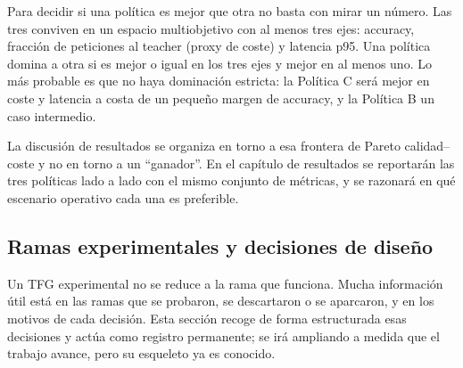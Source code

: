 Para decidir si una política es mejor que otra no basta con mirar un número. Las tres conviven en un espacio multiobjetivo con al menos tres ejes: accuracy, fracción de peticiones al teacher (proxy de coste) y latencia p95. Una política domina a otra si es mejor o igual en los tres ejes y mejor en al menos uno. Lo más probable es que no haya dominación estricta: la Política C será mejor en coste y latencia a costa de un pequeño margen de accuracy, y la Política B un caso intermedio.

La discusión de resultados se organiza en torno a esa frontera de Pareto calidad--coste y no en torno a un ``ganador''. En el capítulo de resultados se reportarán las tres políticas lado a lado con el mismo conjunto de métricas, y se razonará en qué escenario operativo cada una es preferible.

\subsection{Ramas experimentales y decisiones de diseño}
\label{subsec:ramas-experimentales}

Un TFG experimental no se reduce a la rama que funciona. Mucha información útil está en las ramas que se probaron, se descartaron o se aparcaron, y en los motivos de cada decisión. Esta sección recoge de forma estructurada esas decisiones y actúa como registro permanente; se irá ampliando a medida que el trabajo avance, pero su esqueleto ya es conocido.

